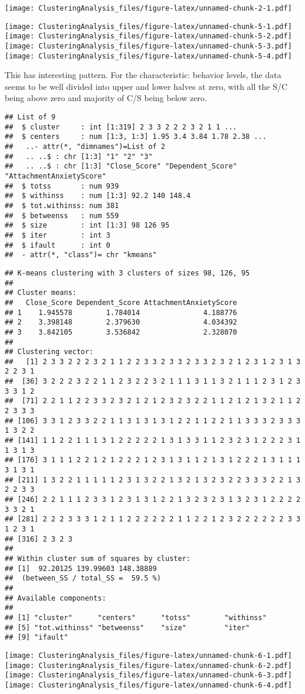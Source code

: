 \documentclass[]{article}
\begin{document}
\texttt{[image: ClusteringAnalysis\_files/figure-latex/unnamed-chunk-2-1.pdf]}

\texttt{[image: ClusteringAnalysis\_files/figure-latex/unnamed-chunk-5-1.pdf]}
\texttt{[image: ClusteringAnalysis\_files/figure-latex/unnamed-chunk-5-2.pdf]}
\texttt{[image: ClusteringAnalysis\_files/figure-latex/unnamed-chunk-5-3.pdf]}
\texttt{[image: ClusteringAnalysis\_files/figure-latex/unnamed-chunk-5-4.pdf]}

This has interesting pattern. For the characteristic: behavior levels,
the data seems to be well divided into upper and lower halves at zero,
with all the S/C being above zero and majority of C/S being below zero.

\begin{verbatim}
## List of 9
##  $ cluster     : int [1:319] 2 3 3 2 2 2 3 2 1 1 ...
##  $ centers     : num [1:3, 1:3] 1.95 3.4 3.84 1.78 2.38 ...
##   ..- attr(*, "dimnames")=List of 2
##   .. ..$ : chr [1:3] "1" "2" "3"
##   .. ..$ : chr [1:3] "Close_Score" "Dependent_Score" "AttachmentAnxietyScore"
##  $ totss       : num 939
##  $ withinss    : num [1:3] 92.2 140 148.4
##  $ tot.withinss: num 381
##  $ betweenss   : num 559
##  $ size        : int [1:3] 98 126 95
##  $ iter        : int 3
##  $ ifault      : int 0
##  - attr(*, "class")= chr "kmeans"
\end{verbatim}

\begin{verbatim}
## K-means clustering with 3 clusters of sizes 98, 126, 95
## 
## Cluster means:
##   Close_Score Dependent_Score AttachmentAnxietyScore
## 1    1.945578        1.784014               4.188776
## 2    3.398148        2.379630               4.034392
## 3    3.842105        3.536842               2.328070
## 
## Clustering vector:
##   [1] 2 3 3 2 2 2 3 2 1 1 2 2 3 3 2 3 3 2 3 3 2 3 2 1 2 3 1 2 3 1 3 2 2 3 1
##  [36] 3 2 2 2 3 2 2 1 1 2 3 2 2 3 2 1 1 1 3 1 1 3 2 1 1 1 2 3 1 2 3 3 3 1 2
##  [71] 2 2 1 1 2 2 3 3 2 3 2 1 2 1 2 3 2 3 2 2 1 1 2 1 2 1 3 2 1 1 2 2 3 3 3
## [106] 3 3 1 2 3 3 2 2 1 1 3 1 3 1 3 1 2 2 1 1 2 2 1 1 3 3 3 2 3 3 3 1 3 2 2
## [141] 1 1 2 2 1 1 1 3 1 2 2 2 2 2 1 3 1 3 3 1 1 2 3 2 3 1 2 2 2 3 1 1 3 1 3
## [176] 3 1 1 1 2 2 1 2 1 2 2 2 1 2 3 1 3 1 1 2 1 3 1 2 2 2 1 3 1 1 1 3 1 3 1
## [211] 1 3 2 2 1 1 1 1 1 2 3 1 3 2 2 1 3 2 1 3 2 3 2 2 3 3 3 2 2 1 3 2 2 3 3
## [246] 2 2 1 1 1 2 3 3 1 2 3 1 3 1 2 2 1 3 2 3 2 3 1 3 2 3 1 2 2 2 2 3 3 2 1
## [281] 2 2 2 3 3 3 1 2 1 1 2 2 2 2 2 2 1 1 2 2 1 2 3 2 2 2 2 2 2 3 3 1 2 3 1
## [316] 2 3 2 3
## 
## Within cluster sum of squares by cluster:
## [1]  92.20125 139.99603 148.38889
##  (between_SS / total_SS =  59.5 %)
## 
## Available components:
## 
## [1] "cluster"      "centers"      "totss"        "withinss"    
## [5] "tot.withinss" "betweenss"    "size"         "iter"        
## [9] "ifault"
\end{verbatim}

\texttt{[image: ClusteringAnalysis\_files/figure-latex/unnamed-chunk-6-1.pdf]}
\texttt{[image: ClusteringAnalysis\_files/figure-latex/unnamed-chunk-6-2.pdf]}
\texttt{[image: ClusteringAnalysis\_files/figure-latex/unnamed-chunk-6-3.pdf]}
\texttt{[image: ClusteringAnalysis\_files/figure-latex/unnamed-chunk-6-4.pdf]}
\end{document}
